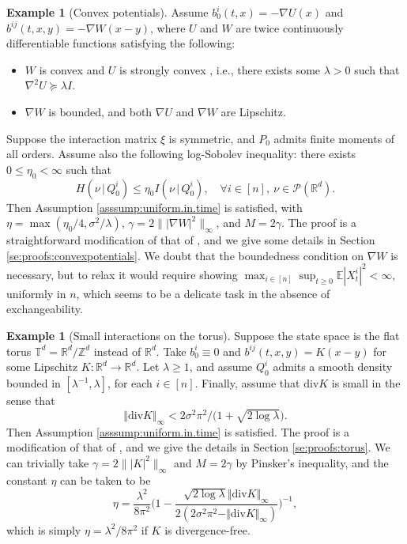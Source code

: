 \documentclass[11pt,reqno]{amsart}
\numberwithin{equation}{section}
\theoremstyle{definition}
\newtheorem{example}[theorem]{Example}\newtheorem{definition}[theorem]{Definition}
\def\diver{\mathrm{div}}
\def\E{{\mathbb E}}
\def\P{{\mathcal P}}
\def\R{{\mathbb R}}
\def\T{{\mathbb T}}
\def\Z{{\mathbb Z}}
\begin{document}
\begin{example}[Convex potentials] \label{ex:convex}
Assume $ b_0^i(t,x) = -\nabla U(x) $ and $ b^{ij}(t,x,y) = - \nabla W(x - y) $,   where $U$ and $W$ are twice continuously differentiable functions satisfying the following:
\begin{itemize} 
	\item $W$ is convex and $U$ is strongly convex , i.e., there exists some $\lambda > 0$ such that $ 	\nabla^2 U \succeq \lambda I$.
	\item $\nabla W$ is bounded, and both $\nabla U$ and $\nabla W$ are Lipschitz. 
\end{itemize}
Suppose the interaction matrix $\xi$ is symmetric, and $P_0$  admits finite  moments of all orders. Assume also the following log-Sobolev inequality: there exists $0 \le \eta_0 < \infty$ such that
\begin{equation*}
H(\nu\,|\,Q^i_0) \le \eta_0 I(\nu\,|\,Q^i_0), \quad \forall i \in [n], \ \nu \in \P(\R^d).
\end{equation*}
Then Assumption \ref{asssump:uniform.in.time} is satisfied, with $\eta = \max(\eta_0/4, \sigma^2/\lambda)$, $\gamma = 2\||\nabla W|^2\|_\infty$, and $M =2\gamma$. The proof is a straightforward modification of that of \cite[Corollary 2.7]{lacker2023sharp}, and we give some details in Section \ref{se:proofs:convexpotentials}.
We doubt that the boundedness condition on $\nabla W$ is necessary, but to relax it would require showing $\max_{i \in [n]}\sup_{t \ge 0}\E|X^i_t|^2 < \infty$, uniformly in $n$, which seems to be a delicate task in the absence of exchangeability.
\end{example}

\begin{example}[Small interactions on the torus] \label{ex:torus}
Suppose the state space is the flat torus $\T^d = \R^d /\Z^d$ instead of $\R^d$.  Take $b_0^i \equiv 0$ and $b^{ij}(t,x, y) = K(x - y)$ for some Lipschitz $K: \R^d \to \R^d$.
Let $\lambda \ge 1$, and assume $Q^i_0$ admits a smooth density bounded in $[\lambda^{-1},\lambda]$, for each $i \in [n]$.
 Finally, assume that $\diver K$ is small in the sense that 
	\begin{equation} \label{eq:K.smallness.assum}
		\Vert \diver K \Vert_\infty  <   2\sigma^2\pi^2 \big/ \big(1 + \sqrt{2 \log \lambda}  \big).
	\end{equation} 
	Then  Assumption  \ref{asssump:uniform.in.time} is satisfied. The proof is a modification of that of \cite[Corollary 2.9 and Lemma 5.1]{lacker2023sharp}, and we give the details in Section \ref{se:proofs:torus}. We can trivially take $\gamma = 2\||K|^2\|_\infty$ and $M= 2\gamma$ by Pinsker's inequality, and the constant $\eta$  can be taken to be
	\begin{equation*}
	\eta = \frac{\lambda^2}{8\pi^2}\bigg(1-\frac{\sqrt{2 \log \lambda} \Vert \diver K \Vert_\infty}{ 2( 2\sigma^2\pi^2 - \Vert \diver K \Vert_\infty ) }\bigg)^{-1},
	\end{equation*}
	which is simply $\eta=\lambda^2/8\pi^2$ if $K$ is divergence-free. 
\end{example}
\end{document}
